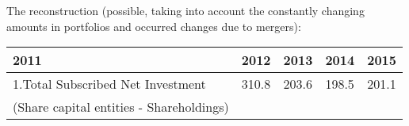 \documentclass[]{book}
\theoremstyle{definition}
\theoremstyle{definition}
\theoremstyle{definition}
\theoremstyle{remark}
\begin{document}
The reconstruction (possible, taking into account the constantly
changing amounts in portfolios and occurred changes due to mergers):

\begin{longtable}[]{@{}lllll@{}}
\toprule
\begin{minipage}[b]{0.17\columnwidth}\raggedright\strut
2011\strut
\end{minipage} & \begin{minipage}[b]{0.17\columnwidth}\raggedright\strut
2012\strut
\end{minipage} & \begin{minipage}[b]{0.17\columnwidth}\raggedright\strut
2013\strut
\end{minipage} & \begin{minipage}[b]{0.17\columnwidth}\raggedright\strut
2014\strut
\end{minipage} & \begin{minipage}[b]{0.17\columnwidth}\raggedright\strut
2015\strut
\end{minipage}\tabularnewline
\midrule
\endhead
\begin{minipage}[t]{0.17\columnwidth}\raggedright\strut
1.Total Subscribed Net Investment\strut
\end{minipage} & \begin{minipage}[t]{0.17\columnwidth}\raggedright\strut
310.8\strut
\end{minipage} & \begin{minipage}[t]{0.17\columnwidth}\raggedright\strut
203.6\strut
\end{minipage} & \begin{minipage}[t]{0.17\columnwidth}\raggedright\strut
198.5\strut
\end{minipage} & \begin{minipage}[t]{0.17\columnwidth}\raggedright\strut
201.1\strut
\end{minipage}\tabularnewline
\begin{minipage}[t]{0.17\columnwidth}\raggedright\strut
(Share capital entities - Shareholdings)\strut
\end{minipage} & \begin{minipage}[t]{0.17\columnwidth}\raggedright\strut
\strut
\end{minipage} & \begin{minipage}[t]{0.17\columnwidth}\raggedright\strut
\strut
\end{minipage} & \begin{minipage}[t]{0.17\columnwidth}\raggedright\strut
\strut
\end{minipage} & \begin{minipage}[t]{0.17\columnwidth}\raggedright\strut

\end{minipage}
\end{longtable}
\end{document}
